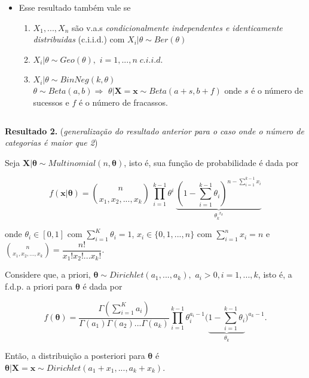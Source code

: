 \documentclass[
]{book}
\providecommand{\tightlist}{%
  \setlength{\itemsep}{0pt}\setlength{\parskip}{0pt}}
\begin{document}
\begin{itemize}
\tightlist
\item
  Esse resultado também vale se

  \begin{enumerate}
  \def\labelenumi{\arabic{enumi}.}
  \tightlist
  \item
    \(X_1,...,X_n\) são v.a.s \emph{condicionalmente independentes e identicamente distribuidas} (c.i.i.d.) com \(X_i|\theta \sim Ber(\theta)\)\\
  \item
    \(X_i|\theta\sim Geo(\theta),\) \(i=1,...,n \; c.i.i.d.\)\\
  \item
    \(X_i|\theta \sim BinNeg(k,\theta)\)\\
    \(\theta\sim Beta(a,b)\Rightarrow\) \(\theta|\boldsymbol X=\boldsymbol x \sim Beta(a+s,b+f)\) onde \(s\) é o número de sucessos e \(f\) é o número de fracassos.
  \end{enumerate}
\end{itemize}

\(~\)

\textbf{Resultado 2.} (\emph{generalização do resultado anterior para o caso onde o número de categorias é maior que 2})

Seja \(\boldsymbol X | \boldsymbol \theta \sim Multinomial(n,\boldsymbol \theta)\), isto é, sua função de probabilidade é dada por

\[f(\boldsymbol x| \boldsymbol \theta)= \binom{n}{x_1,x_2,...,x_k}~\prod_{i=1}^{k-1}\theta^i~\underbrace{\left(1-\sum_{i=1}^{k-1}\theta_i\right)^{\displaystyle n-\sum_{i=1}^{k-1}x_i}}_{\displaystyle \theta_k^{~~x_k}}\]

onde \(\theta_i\in [0,1]\) com \(\sum_{i=1}^K\theta_i=1\), \(x_i \in \{0,1,...,n\}\) com \(\sum_{i=1}^nx_i=n\) e \(\displaystyle \binom{n}{x_1,x_2,...,x_k}=\dfrac{n!}{x_1!x_2!...x_k!}\).

Considere que, a priori, \(\boldsymbol \theta \sim Dirichlet(a_1,...,a_k),\) \(a_i > 0, i=1,...,k\), isto é, a f.d.p. a priori para \(\boldsymbol \theta\) é dada por

\[f(\boldsymbol \theta) = \dfrac{\Gamma(\sum_{i=1}^K a_i)}{\Gamma(a_1)\Gamma(a_2)...\Gamma(a_k)}\prod_{i=1}^{k-1}\theta_i^{a_i-1}\bigg(\underbrace{1-\sum_{i=1}^{k-1}\theta_i}_{\theta_k}\bigg)^{a_k-1}.\]

Então, a distribuição a posteriori para \(\boldsymbol \theta\) é
\(\boldsymbol \theta|\boldsymbol X = \boldsymbol x \sim Dirichlet (a_1+x_1,...,a_k+x_k)\).
\end{document}
